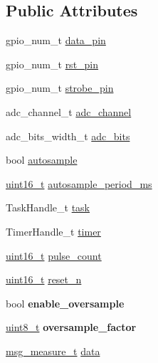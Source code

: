 \subsection*{Public Attributes}
\begin{DoxyCompactItemize}
\item 
gpio\+\_\+num\+\_\+t \hyperlink{structmsg__handle_a6ecce9c5946c5ea3abf2f6a03a3a56d4}{data\+\_\+pin}
\item 
gpio\+\_\+num\+\_\+t \hyperlink{structmsg__handle_ad94640677937313338f02b7f5028d1eb}{rst\+\_\+pin}
\item 
gpio\+\_\+num\+\_\+t \hyperlink{structmsg__handle_a63d6c0448a1ade1b6713b385b1d48fa5}{strobe\+\_\+pin}
\item 
adc\+\_\+channel\+\_\+t \hyperlink{structmsg__handle_abe01e1ee941e2bec055bc2dc49b012d7}{adc\+\_\+channel}
\item 
adc\+\_\+bits\+\_\+width\+\_\+t \hyperlink{structmsg__handle_acab455fa1ecba62ef057c6ff402f4e56}{adc\+\_\+bits}
\item 
bool \hyperlink{structmsg__handle_aef7fc68f0d9d9029114e84c241581d3e}{autosample}
\item 
\hyperlink{vl53l0x__types_8h_a273cf69d639a59973b6019625df33e30}{uint16\+\_\+t} \hyperlink{structmsg__handle_aa33b97382eac6687734713ec1748f01d}{autosample\+\_\+period\+\_\+ms}
\item 
Task\+Handle\+\_\+t \hyperlink{structmsg__handle_a7da2ef315ab07363c565ef5f745f6888}{task}
\item 
Timer\+Handle\+\_\+t \hyperlink{structmsg__handle_a1a3b5ad7116584ac06779562d8b41ec2}{timer}
\item 
\hyperlink{vl53l0x__types_8h_a273cf69d639a59973b6019625df33e30}{uint16\+\_\+t} \hyperlink{structmsg__handle_aa5ad7cd77c31f44c49a979bfda5a65ba}{pulse\+\_\+count}
\item 
\hyperlink{vl53l0x__types_8h_a273cf69d639a59973b6019625df33e30}{uint16\+\_\+t} \hyperlink{structmsg__handle_aa813acda542b8df85aff47b8c481b636}{reset\+\_\+n}
\item 
\mbox{\label{structmsg__handle_a73fe56492bd18326849ce81f59d50f27}} 
bool {\bfseries enable\+\_\+oversample}
\item 
\mbox{\label{structmsg__handle_a3673348c0666fb2d7b8c67a2744a6b88}} 
\hyperlink{vl53l0x__types_8h_aba7bc1797add20fe3efdf37ced1182c5}{uint8\+\_\+t} {\bfseries oversample\+\_\+factor}
\item 
\hyperlink{structMSGEQ7__Measures}{msg\+\_\+measure\+\_\+t} \hyperlink{structmsg__handle_ab8254aa210bf3218eb7c5aeae4751a76}{data}
\end{DoxyCompactItemize}


